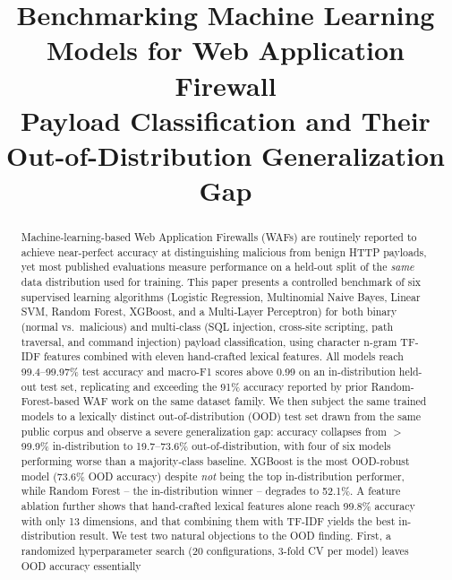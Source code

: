 \documentclass[conference]{IEEEtran}
\begin{document}
\title{Benchmarking Machine Learning Models for Web Application Firewall\\
Payload Classification and Their Out-of-Distribution Generalization Gap}

\author{
\and
{}
}

\maketitle

\begin{abstract}
Machine-learning-based Web Application Firewalls (WAFs) are routinely reported
to achieve near-perfect accuracy at distinguishing malicious from benign HTTP
payloads, yet most published evaluations measure performance on a held-out
split of the \emph{same} data distribution used for training. This paper
presents a controlled benchmark of six supervised learning algorithms
(Logistic Regression, Multinomial Naive Bayes, Linear SVM, Random Forest,
XGBoost, and a Multi-Layer Perceptron) for both binary (normal vs.\ malicious)
and multi-class (SQL injection, cross-site scripting, path traversal, and
command injection) payload classification, using character n-gram TF-IDF
features combined with eleven hand-crafted lexical features. All models reach
99.4--99.97\% test accuracy and macro-F1 scores above 0.99 on an
in-distribution held-out test set, replicating and exceeding the 91\% accuracy
reported by prior Random-Forest-based WAF work on the same dataset family. We
then subject the same trained models to a lexically distinct out-of-distribution
(OOD) test set drawn from the same public corpus and observe a severe
generalization gap: accuracy collapses from $>$99.9\% in-distribution to
19.7--73.6\% out-of-distribution, with four of six models performing worse
than a majority-class baseline. XGBoost is the most OOD-robust model
(73.6\% OOD accuracy) despite \emph{not} being the top in-distribution
performer, while Random Forest -- the in-distribution winner -- degrades to
52.1\%. A feature ablation further shows that hand-crafted lexical features
alone reach 99.8\% accuracy with only 13 dimensions, and that combining them
with TF-IDF yields the best in-distribution result. We test two natural
objections to the OOD finding. First, a randomized hyperparameter search
(20 configurations, 3-fold CV per model) leaves OOD accuracy essentially

\end{abstract}
\end{document}
